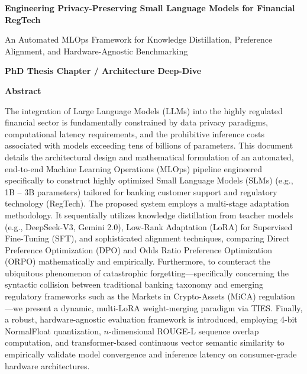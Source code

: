 \documentclass[12pt,a4paper]{report}
\begin{document}
\begin{titlepage}
    \begin{center}
        \vspace*{1cm}
        
        \Huge
        \textbf{Engineering Privacy-Preserving Small Language Models for Financial RegTech}
        
        \vspace{0.5cm}
        \LARGE
        An Automated MLOps Framework for Knowledge Distillation, Preference Alignment, and Hardware-Agnostic Benchmarking
        
        \vspace{1.5cm}
        
        \textbf{PhD Thesis Chapter / Architecture Deep-Dive}
        
        \vfill
        
        \Large
        \textbf{Abstract}
        
        \vspace{0.8cm}
        \normalsize
        \begin{flushleft}
        The integration of Large Language Models (LLMs) into the highly regulated financial sector is fundamentally constrained by data privacy paradigms, computational latency requirements, and the prohibitive inference costs associated with models exceeding tens of billions of parameters. This document details the architectural design and mathematical formulation of an automated, end-to-end Machine Learning Operations (MLOps) pipeline engineered specifically to construct highly optimized Small Language Models (SLMs) (e.g., 1B -- 3B parameters) tailored for banking customer support and regulatory technology (RegTech). The proposed system employs a multi-stage adaptation methodology. It sequentially utilizes knowledge distillation from teacher models (e.g., DeepSeek-V3, Gemini 2.0), Low-Rank Adaptation (LoRA) for Supervised Fine-Tuning (SFT), and sophisticated alignment techniques, comparing Direct Preference Optimization (DPO) and Odds Ratio Preference Optimization (ORPO) mathematically and empirically. Furthermore, to counteract the ubiquitous phenomenon of catastrophic forgetting---specifically concerning the syntactic collision between traditional banking taxonomy and emerging regulatory frameworks such as the Markets in Crypto-Assets (MiCA) regulation---we present a dynamic, multi-LoRA weight-merging paradigm via TIES. Finally, a robust, hardware-agnostic evaluation framework is introduced, employing 4-bit NormalFloat quantization, $n$-dimensional ROUGE-L sequence overlap computation, and transformer-based continuous vector semantic similarity to empirically validate model convergence and inference latency on consumer-grade hardware architectures.
        \end{flushleft}
        

\end{center}
\end{titlepage}
\end{document}
